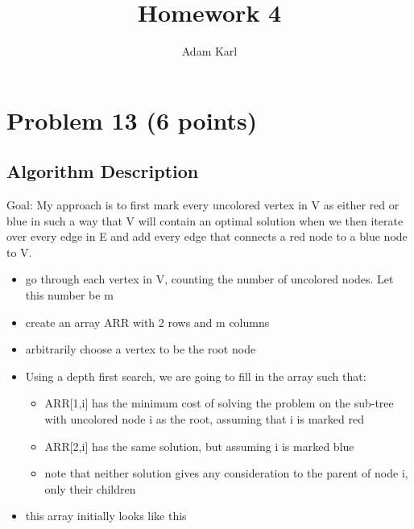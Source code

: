 \documentclass[a4paper]{article}
\title{Homework 4}
\author{Adam Karl}
\begin{document}
\maketitle


\section{Problem 13 (6 points)}
\subsection{Algorithm Description}

Goal: My approach is to first mark every uncolored vertex in V as either red or blue in such a way that V will contain an optimal solution when we then iterate over every edge in E and add every edge that connects a red node to a blue node to V. 



\begin{itemize}
    \item go through each vertex in V, counting the number of uncolored nodes. Let this number be m
    \item create an array ARR with 2 rows and m columns
    \item arbitrarily choose a vertex to be the root node
    \item Using a depth first search, we are going to fill in the array such that:
    \begin{itemize}
        \item ARR[1,i] has the minimum cost of solving the problem on the sub-tree with uncolored node i as the root, assuming that i is marked red
        \item ARR[2,i] has the same solution, but assuming i is marked blue
        \item note that neither solution gives any consideration to the parent of node i, only their children
    \end{itemize}
    \item this array initially looks like this
\end{itemize}
    
\end{document}
